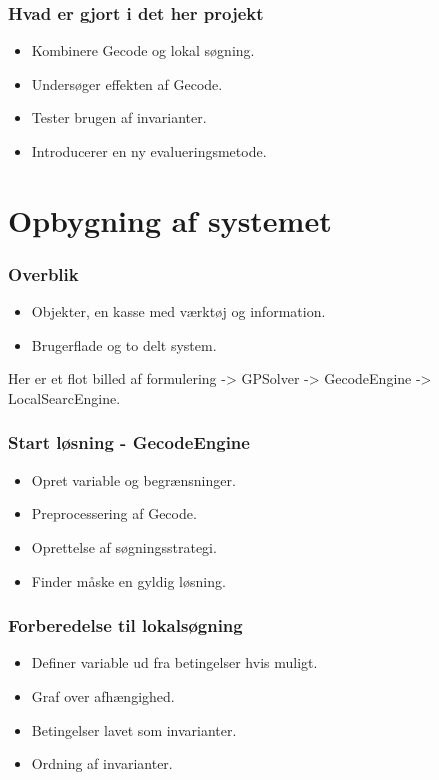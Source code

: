 \documentclass[12pt]{beamer}
\begin{document}
\begin{frame}
\frametitle{Hvad er gjort i det her projekt}
\begin{itemize}[<+->] 
\item Kombinere Gecode og lokal søgning.
\item Undersøger effekten af Gecode. 
\item Tester brugen af invarianter. 
\item Introducerer en ny evalueringsmetode.
\end{itemize}
\end{frame}




\section{Opbygning af systemet}

\begin{frame}
\frametitle{Overblik}
\begin{itemize}[<+->] 
\item Objekter, en kasse med værktøj og information. 
\item Brugerflade og to delt system. 
\end{itemize}
Her er et flot billed af formulering -> GPSolver -> GecodeEngine -> LocalSearcEngine. 

\end{frame}


\begin{frame}
\frametitle{Start løsning - GecodeEngine}
\begin{itemize}[<+->]
\pause 
\item Opret variable og begrænsninger.
\item Preprocessering af Gecode.
\item Oprettelse af søgningsstrategi. 
\item Finder måske en gyldig løsning.
\end{itemize}
\end{frame}

\begin{frame}
\frametitle{Forberedelse til lokalsøgning}
\begin{itemize}[<+->]
\item Definer variable ud fra betingelser hvis muligt.
\item Graf over afhængighed.
\item Betingelser lavet som invarianter.
\item Ordning af invarianter.
\end{itemize}
\end{frame}
\end{document}
